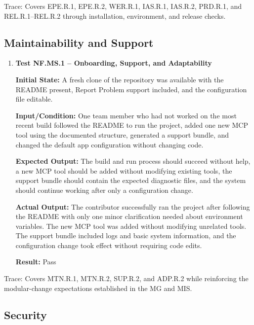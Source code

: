 \documentclass[12pt]{article}
\begin{document}
\noindent Trace: Covers EPE.R.1, EPE.R.2, WER.R.1, IAS.R.1, IAS.R.2, PRD.R.1,
and REL.R.1--REL.R.2 through installation, environment, and release checks.


\subsection{Maintainability and Support}

\begin{enumerate}
    \item \textbf{Test NF.MS.1 -- Onboarding, Support, and Adaptability}
    
    \textbf{Initial State:} A fresh clone of the repository was
    available with the README present, Report Problem support included,
    and the configuration file editable.
    
    \textbf{Input/Condition:} One team member who had not worked on the
    most recent build followed the README to run the project, added one
    new MCP tool using the documented structure, generated a support
    bundle, and changed the default app configuration without changing
    code.
    
    \textbf{Expected Output:} The build and run process should succeed
    without help, a new MCP tool should be added without modifying
    existing tools, the support bundle should contain the expected
    diagnostic files, and the system should continue working after only
    a configuration change.
    
    \textbf{Actual Output:} The contributor successfully ran the
    project after following the README with only one minor clarification
    needed about environment variables. The new MCP tool was added
    without modifying unrelated tools. The support bundle included logs
    and basic system information, and the configuration change took
    effect without requiring code edits.
    
    \textbf{Result:} Pass
\end{enumerate}

\noindent Trace: Covers MTN.R.1, MTN.R.2, SUP.R.2, and ADP.R.2 while reinforcing
the modular-change expectations established in the MG and MIS.


\subsection{Security}
\end{document}

